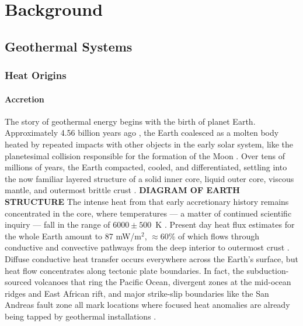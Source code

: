 \chapter{Background}\label{ch2:background}

\section{Geothermal Systems}\label{ch2:geosys}
\subsection{Heat Origins}\label{ch2:heatorig}
\subsubsection{Accretion}\label{ch2:accrete}
The story of geothermal energy begins with the birth of planet Earth. Approximately 4.56 billion years ago \citep{allegre_age_1995, patterson_age_1956}, the Earth coalesced as a molten body heated by repeated impacts with other objects in the early solar system, like the planetesimal collision responsible for the formation of the Moon \citep{stevenson_origin_2014}. Over tens of millions of years, the Earth compacted, cooled, and differentiated, settling into the now familiar layered structure of a solid inner core, liquid outer core, viscous mantle, and outermost brittle crust \citep[p.\ 7]{press_understanding_2004}. \textbf{DIAGRAM OF EARTH STRUCTURE} The intense heat from that early accretionary history remains concentrated in the core, where temperatures --- a matter of continued scientific inquiry --- fall in the range of $6000\pm500$~K \citep[p.\ 372]{fowler_solid_2005}. Present day heat flux estimates for the whole Earth amount to 87 mW/m$^2$, $\approx 60\%$ of which flows through conductive and convective pathways from the deep interior to outermost crust \citep{stein_heat_1995}. Diffuse conductive heat transfer occurs everywhere across %
the Earth’s surface, but heat flow concentrates along tectonic plate boundaries. In fact, the subduction-sourced volcanoes that ring the Pacific Ocean, divergent zones at the mid-ocean ridges and East African rift, and major strike-slip boundaries like the San Andreas fault zone all mark locations where focused heat anomalies are already being tapped by geothermal installations \citep[p.\ 16]{dipippo_geothermal_2012}.

